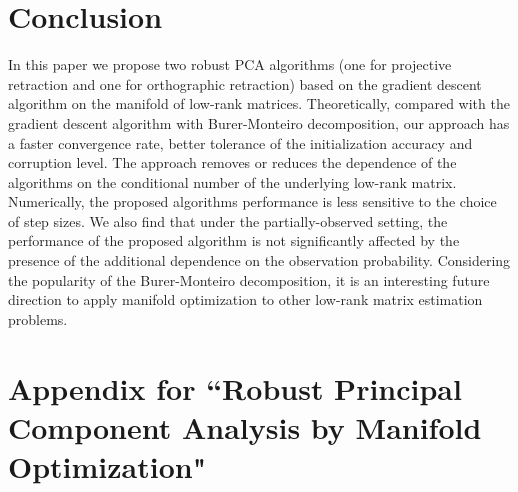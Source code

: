 \documentclass[12pt]{article}
\newcommand{\bX}{\boldsymbol{X}}
\newcommand{\bL}{\boldsymbol{L}}
\def\bY{\boldsymbol{Y}}
\theoremstyle{plain}
\theoremstyle{definition}
\theoremstyle{plain}
\theoremstyle{plain}
\theoremstyle{remark}
\begin{document}


\section{Conclusion}\label{sec:discussion}
In this paper we propose two robust PCA algorithms (one for projective retraction and one for orthographic retraction) based on the gradient descent algorithm on the manifold of low-rank matrices. Theoretically, compared with the gradient descent algorithm with Burer-Monteiro decomposition, our approach has a faster convergence rate, better tolerance of the initialization accuracy and corruption level. The approach removes or reduces the dependence of the algorithms on the conditional number of the underlying low-rank matrix.  Numerically, the proposed algorithms performance is less sensitive to the choice of step sizes. We also find that under the partially-observed setting, the performance of the proposed algorithm is not significantly affected by the presence of the additional dependence on the observation probability.  Considering the popularity of the Burer-Monteiro decomposition, it is an interesting future direction to apply manifold optimization to other low-rank matrix estimation problems.

\newpage
\section*{Appendix for ``Robust Principal Component Analysis by Manifold Optimization"}
\end{document}
